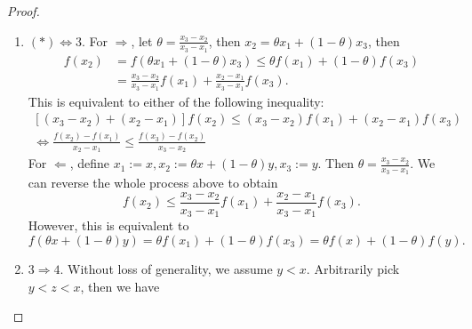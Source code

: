 \documentclass[12pt]{article}
\renewcommand{\(}{\left(}%
\renewcommand{\)}{\right)}%
\renewcommand{\[}{\left[}%
\renewcommand{\]}{\right]}%
\newcommand{\q}{\mathbb{Q}}
\newtheorem{proof}{Proof.}}
\begin{document}
\begin{proof}
\begin{enumerate}
\begin{equation*}
\begin{split}
				&=\theta f(x)+(1-\theta)f(y).
			\end{split}
		\end{equation*}
		Since the convex has a left derivative and a right derivative, it must be left continuous and right continuous, i.e., continuous. Next, for any $\theta\in[0,1]$, we can find a rational sequence $(\theta_n)_{n\geq 1}\subset[0,1]\cap\q$ satisfying $\theta_n\to\theta$. So
		\begin{equation*}
			\begin{split}
				f\(\theta x+(1-\theta)y\)&=\lim_{n\to\infty}f\(\theta_n x+(1-\theta_n)y\)\\
				&\leq\lim_{n\to\infty}\theta_n f(x)+(1-\theta_n)f(y) \\
				&=\theta f(x)+(1-\theta)f(y).
			\end{split}
		\end{equation*}
		\item $(*)\Leftrightarrow 3$. For $\Rightarrow$, let $\theta=\frac{x_3-x_2}{x_3-x_1}$, then $x_2=\theta x_1+(1-\theta)x_3$, then 
		\begin{equation*}
			\begin{split}
				f(x_2)&=f(\theta x_1+(1-\theta)x_3)\leq \theta f(x_1)+(1-\theta)f(x_3)\\
				&=\frac{x_3-x_2}{x_3-x_1}f(x_1)+\frac{x_2-x_1}{x_3-x_1}f(x_3).
			\end{split}
		\end{equation*}
		This is equivalent to either of the following inequality:
		\begin{equation*}
			\begin{split}
				[(x_3-x_2)+(x_2-x_1)]f(x_2)\leq (x_3-x_2)f(x_1)+(x_2-x_1)f(x_3)\\
					\Longleftrightarrow \frac{f(x_2)-f(x_1)}{x_2-x_1}\leq \frac{f(x_3)-f(x_2)}{x_3-x_2}
			\end{split}
		\end{equation*}
		For $\Leftarrow$, define $x_1:=x,x_2:=\theta x+(1-\theta)y, x_3:=y$. Then $\theta=\frac{x_3-x_2}{x_3-x_1}$. We can reverse the whole process above to obtain
		\begin{equation*}
			f(x_2)\leq \frac{x_3-x_2}{x_3-x_1}f(x_1)+\frac{x_2-x_1}{x_3-x_1}f(x_3).
		\end{equation*}
		However, this is equivalent to
		\begin{equation*}
			f(\theta x+(1-\theta)y)=\theta f(x_1)+(1-\theta)f(x_3)=\theta f(x)+(1-\theta)f(y).
		\end{equation*}
		\item $3\Rightarrow 4$. Without loss of generality, we assume $y<x$. Arbitrarily pick $y<z<x$, then we have

\end{enumerate}
\end{proof}
\end{document}
